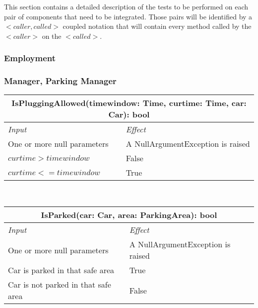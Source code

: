 	This section contains a detailed description of the tests to be performed on each pair of components that need to be integrated. Those pairs will be identified by a $< caller, called >$ coupled notation that will contain every method called by the $< caller >$ on the $< called >$. 

	\subsubsection{Employment}
		
		
		\subsubsection*{Manager, Parking Manager}
		
			\begin{tabular}{ |l|l| }
				\hline
				\multicolumn{2}{|c|}{IsPluggingAllowed(timewindow: Time, curtime: Time, car: Car): bool}\\
				\hline
				\textit{Input} & \textit{Effect}\\ \hline
				One or more null parameters & A NullArgumentException is raised\\ \hline
				$curtime > timewindow$ & False\\ \hline
				$curtime <= timewindow$ & True\\ \hline
			\end{tabular}
			\\
			\begin{tabular}{ |l|l| }
				\hline
				\multicolumn{2}{|c|}{IsParked(car: Car, area: ParkingArea): bool}\\
				\hline
				\textit{Input} & \textit{Effect}\\ \hline
				One or more null parameters & A NullArgumentException is raised\\ \hline
				Car is parked in that safe area & True\\ \hline
				Car is not parked in that safe area & False\\ \hline
			\end{tabular}
			\\			
		
		
		
